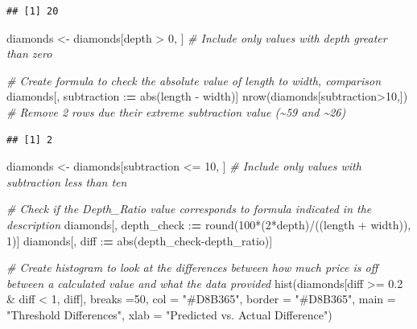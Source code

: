 \documentclass[
]{article}
\newenvironment{Shaded}{\begin{snugshade}}{\end{snugshade}}
\newcommand{\AttributeTok}[1]{\textcolor[rgb]{0.77,0.63,0.00}{#1}}
\newcommand{\CommentTok}[1]{\textcolor[rgb]{0.56,0.35,0.01}{\textit{#1}}}
\newcommand{\DecValTok}[1]{\textcolor[rgb]{0.00,0.00,0.81}{#1}}
\newcommand{\ErrorTok}[1]{\textcolor[rgb]{0.64,0.00,0.00}{\textbf{#1}}}
\newcommand{\FloatTok}[1]{\textcolor[rgb]{0.00,0.00,0.81}{#1}}
\newcommand{\FunctionTok}[1]{\textcolor[rgb]{0.00,0.00,0.00}{#1}}
\newcommand{\NormalTok}[1]{#1}
\newcommand{\OtherTok}[1]{\textcolor[rgb]{0.56,0.35,0.01}{#1}}
\newcommand{\SpecialCharTok}[1]{\textcolor[rgb]{0.00,0.00,0.00}{#1}}
\newcommand{\StringTok}[1]{\textcolor[rgb]{0.31,0.60,0.02}{#1}}
\begin{document}
\begin{verbatim}
## [1] 20
\end{verbatim}

\begin{Shaded}
\begin{Highlighting}[]
\NormalTok{diamonds }\OtherTok{\textless{}{-}}\NormalTok{ diamonds[depth }\SpecialCharTok{\textgreater{}} \DecValTok{0}\NormalTok{, ] }\CommentTok{\# Include only values with depth greater than zero}

\CommentTok{\# Create formula to check the absolute value of length to width, comparison }
\NormalTok{diamonds[, subtraction }\SpecialCharTok{:}\ErrorTok{=} \FunctionTok{abs}\NormalTok{(length }\SpecialCharTok{{-}}\NormalTok{ width)]}
\FunctionTok{nrow}\NormalTok{(diamonds[subtraction}\SpecialCharTok{\textgreater{}}\DecValTok{10}\NormalTok{,]) }\CommentTok{\# Remove 2 rows due their extreme subtraction value (\textasciitilde{}59 and \textasciitilde{}26)}
\end{Highlighting}
\end{Shaded}

\begin{verbatim}
## [1] 2
\end{verbatim}

\begin{Shaded}
\begin{Highlighting}[]
\NormalTok{diamonds }\OtherTok{\textless{}{-}}\NormalTok{ diamonds[subtraction }\SpecialCharTok{\textless{}=} \DecValTok{10}\NormalTok{, ] }\CommentTok{\# Include only values with subtraction less than ten}

\CommentTok{\# Check if the Depth\_Ratio value corresponds to formula indicated in the description}
\NormalTok{diamonds[, depth\_check }\SpecialCharTok{:}\ErrorTok{=} \FunctionTok{round}\NormalTok{(}\DecValTok{100}\SpecialCharTok{*}\NormalTok{(}\DecValTok{2}\SpecialCharTok{*}\NormalTok{depth)}\SpecialCharTok{/}\NormalTok{((length }\SpecialCharTok{+}\NormalTok{ width)), }\DecValTok{1}\NormalTok{)]}
\NormalTok{diamonds[, diff }\SpecialCharTok{:}\ErrorTok{=} \FunctionTok{abs}\NormalTok{(depth\_check}\SpecialCharTok{{-}}\NormalTok{depth\_ratio)]}

\CommentTok{\# Create histogram to look at the differences between how much price is off between a calculated value and what the data provided}
\FunctionTok{hist}\NormalTok{(diamonds[diff }\SpecialCharTok{\textgreater{}=} \FloatTok{0.2} \SpecialCharTok{\&}\NormalTok{ diff }\SpecialCharTok{\textless{}} \DecValTok{1}\NormalTok{, diff], }\AttributeTok{breaks =}\DecValTok{50}\NormalTok{, }\AttributeTok{col =} \StringTok{"\#D8B365"}\NormalTok{, }\AttributeTok{border =} \StringTok{"\#D8B365"}\NormalTok{, }\AttributeTok{main =} \StringTok{"Threshold Differences"}\NormalTok{, }\AttributeTok{xlab =} \StringTok{"Predicted vs. Actual Difference"}\NormalTok{)}
\end{Highlighting}
\end{Shaded}
\end{document}
